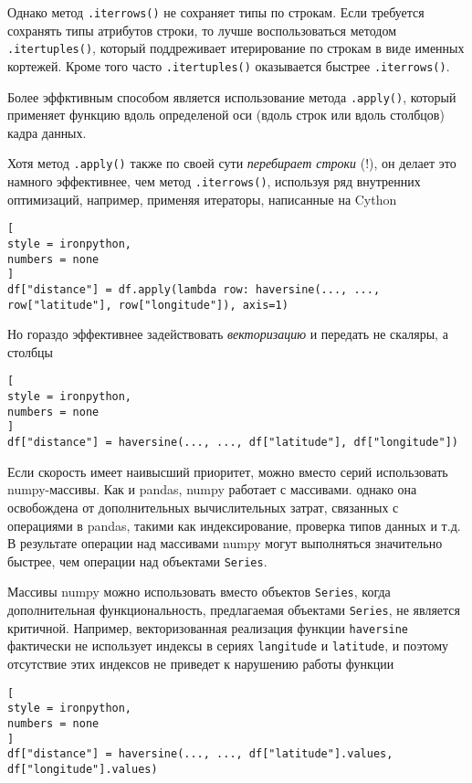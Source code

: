 \documentclass[%
	11pt,
	a4paper,
	utf8,
		]{article}
\begin{document}
Однако метод \verb|.iterrows()| не сохраняет типы по строкам. Если требуется сохранять типы атрибутов строки, то лучше воспользоваться методом \verb|.itertuples()|, который поддреживает итерирование по строкам в виде именных кортежей. Кроме того часто \verb|.itertuples()| оказывается быстрее \verb|.iterrows()|.

Более эффктивным способом является использование метода \texttt{.apply()}, который применяет функцию вдоль определеной оси (вдоль строк или вдоль столбцов) кадра данных.

Хотя метод \texttt{.apply()} также по своей сути \emph{\color{red}перебирает строки} (!), он делает это намного эффективнее, чем метод \texttt{.iterrows()}, используя ряд внутренних оптимизаций, например, применяя итераторы, написанные на Cython \cite[]{heydt:pandas-2019}
\begin{lstlisting}[
style = ironpython,
numbers = none
]
df["distance"] = df.apply(lambda row: haversine(..., ..., row["latitude"], row["longitude"]), axis=1)
\end{lstlisting}

Но гораздо эффективнее задействовать \emph{векторизацию} и передать не скаляры, а столбцы
\begin{lstlisting}[
style = ironpython,
numbers = none
]
df["distance"] = haversine(..., ..., df["latitude"], df["longitude"])
\end{lstlisting}

Если скорость имеет наивысший приоритет, можно вместо серий использовать numpy-массивы. Как и pandas, numpy работает с массивами. однако она освобождена от дополнительных вычислительных затрат, связанных с операциями в pandas, такими как индексирование, проверка типов данных и т.д. В результате операции над массивами numpy могут выполняться значительно быстрее, чем операции над объектами \texttt{Series}.

Массивы numpy можно использовать вместо объектов \texttt{Series}, когда дополнительная функциональность, предлагаемая объектами \texttt{Series}, не является критичной. Например, векторизованная реализация функции \texttt{haversine} фактически не использует индексы в сериях \texttt{langitude} и \texttt{latitude}, и поэтому отсутствие этих индексов не приведет к нарушению работы функции
\begin{lstlisting}[
style = ironpython,
numbers = none
]
df["distance"] = haversine(..., ..., df["latitude"].values, df["longitude"].values)
\end{lstlisting}
\end{document}
